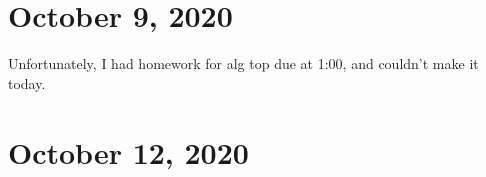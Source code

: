 \section{October 9, 2020}
Unfortunately, I had homework for alg top due at 1:00, and couldn't make it today.
\section{October 12, 2020}
